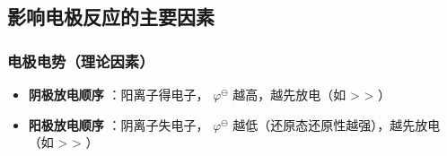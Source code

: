 \subsection{影响电极反应的主要因素} 
\subsubsection{电极电势（理论因素）} 
\begin{itemize} 
    \item \textbf{阴极放电顺序} ：阳离子得电子， $ \varphi^\ominus $ 越高，越先放电（如   >    >   ）
    \item \textbf{阳极放电顺序} ：阴离子失电子， $ \varphi^\ominus $ 越低（还原态还原性越强），越先放电（如   >    >   ）
\end{itemize} 

